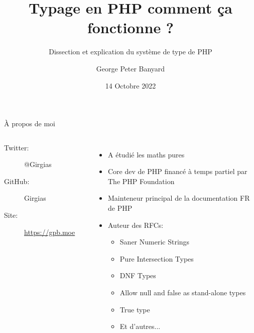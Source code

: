\documentclass[10pt]{beamer}
\title{Typage en PHP comment ça fonctionne ?}
\subtitle{Dissection et explication du système de type de PHP}
\date{14 Octobre 2022}
\author{George Peter Banyard}
\institute{The PHP Foundation}
\begin{document}
\maketitle

\begin{frame}{À propos de moi}
    
    \begin{columns}[T,onlytextwidth]
            \begin{description}
                  \item[Twitter:] @Girgias
                 \item[GitHub:] Girgias
                  \item[Site:] \url{https://gpb.moe}
            \end{description}
            \begin{center}
                  
            \end{center}
            
            \begin{itemize}
                \item A étudié les maths pures
                \item Core dev de PHP financé à temps partiel par \alert{The PHP Foundation}
                \item Mainteneur principal de la documentation FR de PHP
                \item Auteur des RFCs:
                    \begin{itemize}
                        \item Saner Numeric Strings \cite{banyard_saner_2020}
                        \item Pure Intersection Types \cite{banyard_pure_2021}
                        \item DNF Types \cite{banyard_disjunctive_2022}
                        \item Allow null and false as stand-alone types \cite{banyard_allow_2022}
                        \item True type \cite{banyard_add_2022}
                        \item Et d'autres...
                    \end{itemize}
            \end{itemize}
    \end{columns}
\end{frame}
\end{document}
